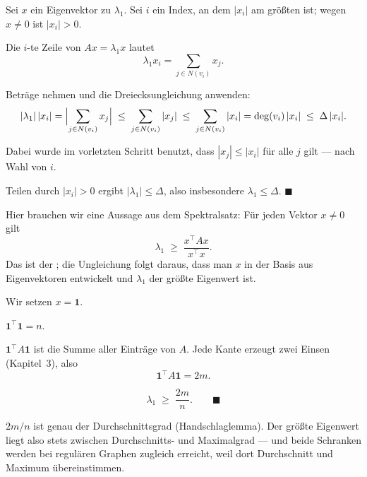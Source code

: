 \begin{merksatz}
Sei $x$ ein Eigenvektor zu $\lambda_1$. Sei $i$ ein Index, an dem $|x_i|$ am größten ist; wegen $x \neq 0$ ist $|x_i| > 0$.

Die $i$-te Zeile von $Ax = \lambda_1 x$ lautet
\[ \lambda_1 x_i = \sum_{j \in N(v_i)} x_j . \]

Beträge nehmen und die Dreiecksungleichung anwenden:
\[ |\lambda_1|\,|x_i| = \Bigl|\sum_{j \in N(v_i)} x_j\Bigr| \;\le\; \sum_{j \in N(v_i)} |x_j| \;\le\; \sum_{j \in N(v_i)} |x_i| = \deg(v_i)\,|x_i| \;\le\; \Delta\,|x_i| . \]

Dabei wurde im vorletzten Schritt benutzt, dass $|x_j| \le |x_i|$ für alle $j$ gilt --- nach Wahl von $i$.

Teilen durch $|x_i| > 0$ ergibt $|\lambda_1| \le \Delta$, also insbesondere $\lambda_1 \le \Delta$. $\blacksquare$

\begin{center}
\begin{minipage}{0.88\textwidth}
\end{minipage}
\end{center}
\end{merksatz}

\begin{merksatz}
Hier brauchen wir eine Aussage aus dem Spektralsatz: Für jeden Vektor $x \neq 0$ gilt
\[ \lambda_1 \;\ge\; \frac{x^{\!\top} A x}{x^{\!\top} x} . \]
Das ist der ; die Ungleichung folgt daraus, dass man $x$ in der Basis aus Eigenvektoren entwickelt und $\lambda_1$ der größte Eigenwert ist.

Wir setzen $x = \mathbf{1}$.

 $\mathbf{1}^{\!\top}\mathbf{1} = n$.

 $\mathbf{1}^{\!\top} A \mathbf{1}$ ist die Summe aller Einträge von $A$. Jede Kante erzeugt zwei Einsen (Kapitel~3), also
\[ \mathbf{1}^{\!\top} A \mathbf{1} = 2m . \]

\[ \lambda_1 \;\ge\; \frac{2m}{n} . \qquad \blacksquare \]

$2m/n$ ist genau der Durchschnittsgrad (Handschlaglemma). Der größte Eigenwert liegt also stets zwischen Durchschnitts- und Maximalgrad --- und beide Schranken werden bei regulären Graphen zugleich erreicht, weil dort Durchschnitt und Maximum übereinstimmen.
\end{merksatz}

